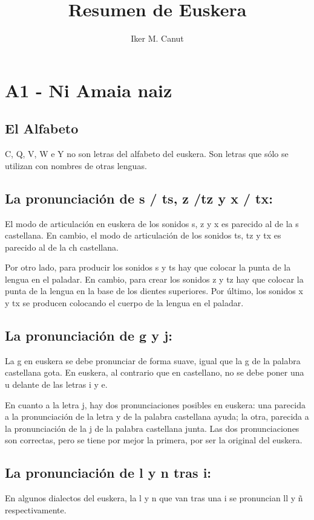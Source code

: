 \documentclass[11pt, a4paper]{article}
\begin{document}
\author{Iker M. Canut}
\title{Resumen de Euskera\\}
\maketitle
\newpage

\section{A1 - Ni Amaia naiz}
\subsection{El Alfabeto}
C, Q, V, W  e  Y no son letras del alfabeto del euskera. Son letras que sólo se utilizan con nombres de otras lenguas.

\subsection{La pronunciación de s / ts, z /tz y x / tx: }
El modo de articulación en euskera de los sonidos s, z y x es parecido al de la s castellana. En cambio, el modo de articulación de los sonidos ts, tz y tx es parecido al de la ch castellana.

Por otro lado, para producir los sonidos s y ts hay que colocar la punta de la lengua en el paladar. En cambio, para crear los sonidos z y tz hay que colocar la punta de la lengua en la base de los dientes superiores. Por último, los sonidos x y tx se producen colocando el cuerpo de la lengua en el paladar.


\subsection{La pronunciación de g y j:}
La g en euskera se debe pronunciar de forma suave, igual que la g de la palabra castellana gota. En euskera, al contrario que en castellano, no se debe poner una u delante de las letras i y e.

En cuanto a la letra j, hay dos pronunciaciones posibles en euskera: una parecida a la pronunciación de la letra y de la palabra castellana ayuda; la otra, parecida a la pronunciación de la j de la palabra castellana junta. Las dos pronunciaciones son correctas, pero se tiene por mejor la primera, por ser la original del euskera. 

\subsection{La pronunciación de l y n tras i: }
En algunos dialectos del euskera, la l y n que van tras una i se pronuncian ll y ñ respectivamente.
\end{document}

